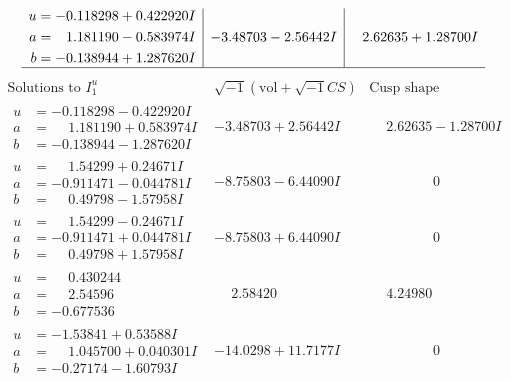 \documentclass[1p]{elsarticle_modified}
\theoremstyle{definition}
\newcommand{\I}{\sqrt{-1}}
\begin{document}
$$\begin{array}{c|c|c}
\begin{aligned}
u &= -0.118298 + 0.422920 I \\
a &= \phantom{-}1.181190 - 0.583974 I \\
b &= -0.138944 + 1.287620 I\end{aligned}
 & -3.48703 - 2.56442 I & \phantom{-}2.62635 + 1.28700 I\\
 \hline 
 \end{array}$$\newpage$$\begin{array}{c|c|c}  
\text{Solutions to }I^u_{1}& \I (\text{vol} + \sqrt{-1}CS) & \text{Cusp shape}\\
 \hline 
\begin{aligned}
u &= -0.118298 - 0.422920 I \\
a &= \phantom{-}1.181190 + 0.583974 I \\
b &= -0.138944 - 1.287620 I\end{aligned}
 & -3.48703 + 2.56442 I & \phantom{-}2.62635 - 1.28700 I \\ \hline\begin{aligned}
u &= \phantom{-}1.54299 + 0.24671 I \\
a &= -0.911471 - 0.044781 I \\
b &= \phantom{-}0.49798 - 1.57958 I\end{aligned}
 & -8.75803 - 6.44090 I & \phantom{-0.000000 } 0 \\ \hline\begin{aligned}
u &= \phantom{-}1.54299 - 0.24671 I \\
a &= -0.911471 + 0.044781 I \\
b &= \phantom{-}0.49798 + 1.57958 I\end{aligned}
 & -8.75803 + 6.44090 I & \phantom{-0.000000 } 0 \\ \hline\begin{aligned}
u &= \phantom{-}0.430244\phantom{ +0.000000I} \\
a &= \phantom{-}2.54596\phantom{ +0.000000I} \\
b &= -0.677536\phantom{ +0.000000I}\end{aligned}
 & \phantom{-}2.58420\phantom{ +0.000000I} & \phantom{-}4.24980\phantom{ +0.000000I} \\ \hline\begin{aligned}
u &= -1.53841 + 0.53588 I \\
a &= \phantom{-}1.045700 + 0.040301 I \\
b &= -0.27174 - 1.60793 I\end{aligned}
 & -14.0298 + 11.7177 I & \phantom{-0.000000 } 0 \\ \hline\begin{aligned}

\end{aligned}
\end{array}$$
\end{document}
